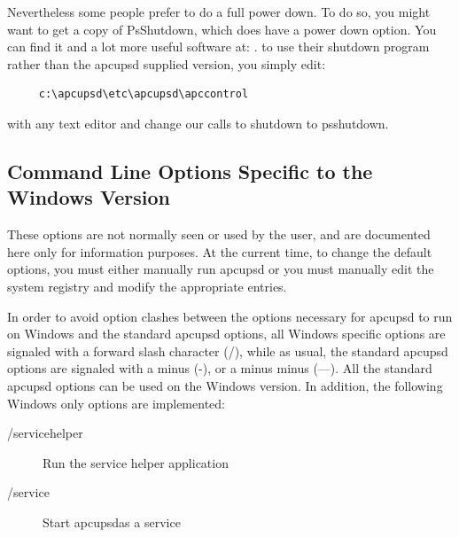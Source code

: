 {{{{{{{Nevertheless some people prefer to do a full power down. To do so, you might
want to get a copy of PsShutdown, which does have a power down option. You can
find it and a lot more useful software at: 
. to use their shutdown program
rather than the apcupsd supplied version, you simply edit: 

\footnotesize
\begin{verbatim}
     c:\apcupsd\etc\apcupsd\apccontrol
\end{verbatim}
\normalsize

with any text editor and change our calls to shutdown to psshutdown. 

\label{Command-Line-Options-Specific-to-the-Windows-Version}

\subsection*{Command Line Options Specific to the Windows Version}

\label{index-Windows_002c-Options-186}
These options are not normally seen or used by the user, and are documented
here only for information purposes. At the current time, to change the default
options, you must either manually run apcupsd or you must manually edit the
system registry and modify the appropriate entries.  

In order to avoid option clashes between the options necessary for apcupsd to
run on Windows and the standard apcupsd options, all Windows specific options
are signaled with a forward slash character (/), while as usual, the standard
apcupsd options are signaled with a minus (-), or a minus minus ({---}). All
the standard apcupsd options can be used on the Windows version. In addition,
the following Windows only options are implemented:  

\begin{description}

\item [/servicehelper]
   Run the service helper application  

\item [/service]
   Start apcupsdas a service  


\end{description}}}}}}}}

